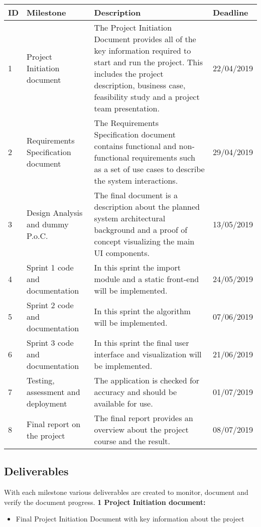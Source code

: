 \documentclass[notitlepage]{article}
\begin{document}
\begin{flushleft}
\begin{center}
  \begin{tabular}{ m{0.4cm} m{5cm} m{8.5cm} m{2cm} }
  	\hline
		ID & Milestone & Description & Deadline \\ \hline
		1 & Project Initiation document & The Project Initiation Document provides all of the key information required to start and run the project. This includes the project description, business case, feasibility study and a project team presentation.  & 22/04/2019 \\ \hline
		2 & Requirements Specification document & The Requirements Specification document contains functional and non-functional requirements such as a set of use cases to describe the system interactions. & 29/04/2019 \\ \hline
		3 & Design Analysis and dummy P.o.C. & The final document is a description about the planned system architectural background and a proof of concept visualizing the main UI components. & 13/05/2019 \\ \hline
		4 & Sprint 1 code and documentation & In this sprint the import module and a static front-end will be implemented.  & 24/05/2019 \\ \hline
		5 & Sprint 2 code and documentation & In this sprint the algorithm will be implemented. & 07/06/2019 \\ \hline
		6 & Sprint 3 code and documentation & In this sprint the final user interface and visualization will be implemented. & 21/06/2019 \\ \hline
		7 & Testing, assessment and deployment & The application is checked for accuracy and should be available for use. & 01/07/2019 \\ \hline
		8 & Final report on the project & The final report provides an overview about the project course and the result. & 08/07/2019 \\ \hline
	\end{tabular}
\end{center}

 

\subsection{Deliverables}
With each milestone various deliverables are created to monitor, document and verify the document progress.
\newline
\textbf{1 Project Initiation document:}
\\
\begin{itemize}
	\item Final Project Initiation Document with key information about the project
\end{itemize}


\end{flushleft}
\end{document}
